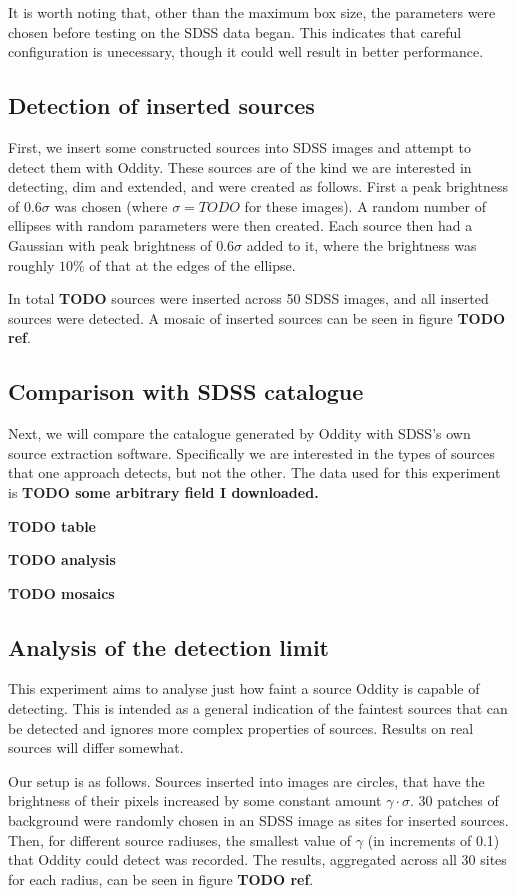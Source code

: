 \documentclass[manuscript]{aastex}
\newcommand{\TODO}[1]{\textbf{TODO #1}}
\begin{document}
It is worth noting that, other than the maximum box size, the parameters were chosen before testing on the SDSS data began. This indicates that careful configuration is unecessary, though it could well result in better performance.

\subsection{Detection of inserted sources}

First, we insert some constructed sources into SDSS images and attempt to detect them with Oddity. These sources are of the kind we are interested in detecting, dim and extended, and were created as follows. First a peak brightness of $0.6 \sigma$ was chosen (where $\sigma = TODO$ for these images). A random number of ellipses with random parameters were then created. Each source then had a Gaussian with peak brightness of $0.6\sigma$ added to it, where the brightness was roughly $10\%$ of that at the edges of the ellipse.

In total \TODO{} sources were inserted across 50 SDSS images, and all inserted sources were detected. A mosaic of inserted sources can be seen in figure \TODO{ref}.

\subsection{Comparison with SDSS catalogue}

Next, we will compare the catalogue generated by Oddity with SDSS's own source extraction software. Specifically we are interested in the types of sources that one approach detects, but not the other. The data used for this experiment is \TODO{some arbitrary field I downloaded.}

\TODO{table}

\TODO{analysis}

\TODO{mosaics}

\subsection{Analysis of the detection limit}

This experiment aims to analyse just how faint a source Oddity is capable of detecting. This is intended as a general indication of the faintest sources that can be detected and ignores more complex properties of sources. Results on real sources will differ somewhat.

Our setup is as follows. Sources inserted into images are circles, that have the brightness of their pixels increased by some constant amount $\gamma \cdot \sigma$. 30 patches of background were randomly chosen in an SDSS image as sites for inserted sources. Then, for different source radiuses, the smallest value of $\gamma$ (in increments of 0.1) that Oddity could detect was recorded. The results, aggregated across all 30 sites for each radius, can be seen in figure \TODO{ref}.
\end{document}
